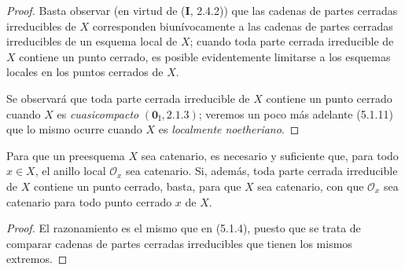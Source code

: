 \begin{proof}
Basta observar (en virtud de (\textbf I, 2.4.2)) que las cadenas de partes cerradas
irreducibles de $X$ corresponden biunívocamente a las cadenas de partes
cerradas irreducibles de un esquema local de $X$; cuando toda parte cerrada
irreducible de $X$ contiene un punto cerrado, es posible evidentemente limitarse
a los esquemas locales en los puntos cerrados de $X$.

Se observará que toda parte cerrada irreducible de $X$ contiene un punto cerrado
cuando $X$ es \emph{cuasicompacto} $(\mathbf{0}_{\mathrm I},2.1.3)$; veremos un poco más
adelante (5.1.11) que lo mismo ocurre cuando $X$ es \emph{localmente
noetheriano}.
\end{proof}

\begin{corollary}[5.1.5]
\label{IV.2.5.1.5-fr}
Para que un preesquema $X$ sea catenario, es necesario y suficiente que, para
todo $x\in X$, el anillo local $\mathcal O_x$ sea catenario. Si, además, toda
parte cerrada irreducible de $X$ contiene un punto cerrado, basta, para que $X$
sea catenario, con que $\mathcal O_x$ sea catenario para todo punto cerrado $x$
de $X$.
\end{corollary}

\begin{proof}
El razonamiento es el mismo que en (5.1.4), puesto que se trata de comparar
cadenas de partes cerradas irreducibles que tienen los mismos extremos.
\end{proof}

